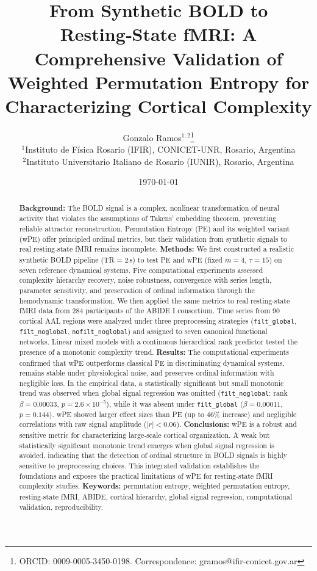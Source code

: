 \documentclass[12pt,a4paper]{article}
\title{From Synthetic BOLD to Resting‑State fMRI: A Comprehensive Validation of Weighted Permutation Entropy for Characterizing Cortical Complexity}
\author{
	Gonzalo Ramos$^{1,2}$\thanks{ORCID: 0009-0005-3450-0198. Correspondence: gramos@ifir-conicet.gov.ar} \\
	$^{1}$Instituto de Física Rosario (IFIR), CONICET-UNR, Rosario, Argentina \\
	$^{2}$Instituto Universitario Italiano de Rosario (IUNIR), Rosario, Argentina
}
\date{\today}
\begin{document}
	
	\maketitle
	
	\begin{abstract}
		\textbf{Background:} The BOLD signal is a complex, nonlinear transformation of neural activity that violates the assumptions of Takens' embedding theorem, preventing reliable attractor reconstruction. Permutation Entropy (PE) and its weighted variant (wPE) offer principled ordinal metrics, but their validation from synthetic signals to real resting‑state fMRI remains incomplete.
		\textbf{Methods:} We first constructed a realistic synthetic BOLD pipeline (TR = 2\,s) to test PE and wPE (fixed $m=4$, $\tau=15$) on seven reference dynamical systems. Five computational experiments assessed complexity hierarchy recovery, noise robustness, convergence with series length, parameter sensitivity, and preservation of ordinal information through the hemodynamic transformation. We then applied the same metrics to real resting‑state fMRI data from 284 participants of the ABIDE I consortium. Time series from 90 cortical AAL regions were analyzed under three preprocessing strategies (\texttt{filt\_global}, \texttt{filt\_noglobal}, \texttt{nofilt\_noglobal}) and assigned to seven canonical functional networks. Linear mixed models with a continuous hierarchical rank predictor tested the presence of a monotonic complexity trend.
		\textbf{Results:} The computational experiments confirmed that wPE outperforms classical PE in discriminating dynamical systems, remains stable under physiological noise, and preserves ordinal information with negligible loss. In the empirical data, a statistically significant but small monotonic trend was observed when global signal regression was omitted (\texttt{filt\_noglobal}: rank $\beta = 0.00033$, $p = 2.6\times10^{-5}$), while it was absent under \texttt{filt\_global} ($\beta = 0.00011$, $p = 0.144$). wPE showed larger effect sizes than PE (up to 46\% increase) and negligible correlations with raw signal amplitude ($|r| < 0.06$).
		\textbf{Conclusions:} wPE is a robust and sensitive metric for characterizing large‑scale cortical organization. A weak but statistically significant monotonic trend emerges when global signal regression is avoided, indicating that the detection of ordinal structure in BOLD signals is highly sensitive to preprocessing choices. This integrated validation establishes the foundations and exposes the practical limitations of wPE for resting‑state fMRI complexity studies.
		\textbf{Keywords:} permutation entropy, weighted permutation entropy, resting‑state fMRI, ABIDE, cortical hierarchy, global signal regression, computational validation, reproducibility.
	\end{abstract}
	
\end{document}
